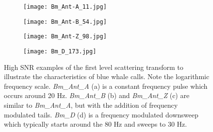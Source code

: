 {\begin{figure}
     \centering
     \begin{subfigure}[]{0.45\textwidth}
         \centering
         \texttt{[image: Bm\_Ant-A\_11.jpg]}
     \end{subfigure}
     \hfill
     \begin{subfigure}[]{0.45\textwidth}
         \centering
         \texttt{[image: Bm\_Ant-B\_54.jpg]}
     \end{subfigure}
     \hfill
     \begin{subfigure}[]{0.45\textwidth}
         \centering
         \texttt{[image: Bm\_Ant-Z\_98.jpg]}
     \end{subfigure}
     \hfill
     \begin{subfigure}[]{0.45\textwidth}
         \centering
         \texttt{[image: Bm\_D\_173.jpg]}
     \end{subfigure}
        \caption{High SNR examples of the first level scattering transform to illustrate the characteristics of blue whale calls. Note the logarithmic frequency scale.  \textit{Bm\_Ant\_A} (a) is a constant frequency pulse which occurs around 20 Hz. \textit{Bm\_Ant\_B} (b) and \textit{Bm\_Ant\_Z} (c) are similar to \textit{Bm\_Ant\_A}, but with the addition of frequency modulated tails. \textit{Bm\_D} (d) is a frequency modulated downsweep which typically starts around the 80 Hz and sweeps to 30 Hz.}
        \label{fig:Bm_Ex}
\end{figure}


}

